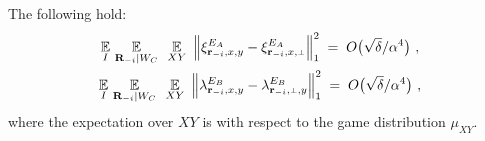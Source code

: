 \begin{claim}\label{claim:xi-change-y}
The following hold:
\begin{gather}
\Ex_I \, \Ex_{\bR_\mi |  W_C} \, \, \, \Ex_{XY} \,\, \Big \| \xi^{E_A}_\ssxy - \xi^{E_A}_\ssxp \Big \|_1^2\; = \; O\big(\sqrt{\delta}/\alpha^4 \big)~, \label{eq:E_A_1} \\
\Ex_I \, \Ex_{\bR_\mi |  W_C} \, \, \, \Ex_{XY} \,\, \Big \| \lambda^{E_B}_\ssxy - \lambda^{E_B}_\sspy \Big \|_1^2\; = \; O\big(\sqrt{\delta}/\alpha^4 \big)~, \label{eq:E_A_2}
\end{gather}
where the expectation over $XY$ is with respect to the game distribution $\mu_{XY}$. 
\end{claim}

